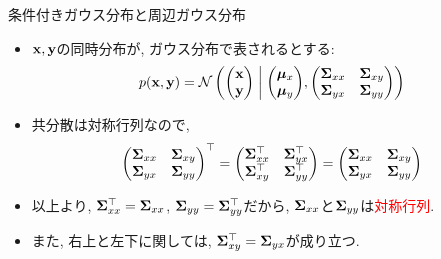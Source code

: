 \documentclass[dvipdfmx,notheorems,t]{beamer}
\begin{document}
\begin{frame}{条件付きガウス分布と周辺ガウス分布}
\begin{itemize}
  \item $\vb{x}, \vb{y}$の同時分布が, ガウス分布で表されるとする:
  \begin{align*}
    p(\vb{x}, \vb{y}) = \mathcal{N} \left( \mqty(\vb{x} \\ \vb{y}) \middlerel|
      \mqty(\vb*{\mu}_x \\ \vb*{\mu}_y),
      \mqty(\vb{\Sigma}_{xx} & \vb{\Sigma}_{xy} \\
        \vb{\Sigma}_{yx} & \vb{\Sigma}_{yy}) \right)
  \end{align*}
  \item 共分散は対称行列なので,
  \begin{align*}
    \mqty(\vb{\Sigma}_{xx} & \vb{\Sigma}_{xy} \\
      \vb{\Sigma}_{yx} & \vb{\Sigma}_{yy})^\top
    = \mqty(\vb{\Sigma}_{xx}^\top & \vb{\Sigma}_{yx}^\top \\
      \vb{\Sigma}_{xy}^\top & \vb{\Sigma}_{yy}^\top)
    = \mqty(\vb{\Sigma}_{xx} & \vb{\Sigma}_{xy} \\
      \vb{\Sigma}_{yx} & \vb{\Sigma}_{yy})
  \end{align*}
  \item 以上より, $\vb{\Sigma}_{xx}^\top = \vb{\Sigma}_{xx}$,
  $\vb{\Sigma}_{yy} = \vb{\Sigma}_{yy}^\top$だから,
  $\vb{\Sigma}_{xx}$と$\vb{\Sigma}_{yy}$は\textcolor{red}{対称行列}.
  \item また, 右上と左下に関しては, \textcolor{red}{$\vb{\Sigma}_{xy}^\top = \vb{\Sigma}_{yx}$}が成り立つ.
\end{itemize}
\end{frame}
\end{document}
